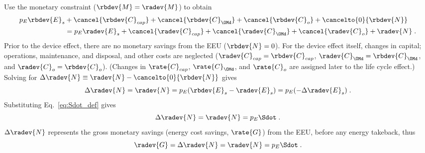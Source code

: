 \begin{landscape}
{Use the monetary constraint ($\rbdev{M} = \radev{M}$) to obtain
%
\begin{align}
  p_E \rbdev{E}_s &+ \cancel{\rbdev{C}_{cap}} + \cancel{\rbdev{C}_{\OMd}} + \cancel{\rbdev{C}_o} + \cancelto{0}{\rbdev{N}} \nonumber \\
                  &= p_E \radev{E}_s + \cancel{\radev{C}_{cap}} + \cancel{\radev{C}_{\OMd}} + \cancel{\radev{C}_o}  + \radev{N} \; .
\end{align}
%
Prior to the device effect, there are no monetary savings from the EEU ($\rbdev{N} = 0$).
For the device effect itself, 
changes in capital; operations, maintenance, and disposal, and other costs are neglected
($\radev{C}_{cap} = \rbdev{C}_{cap}$, $\radev{C}_{\OMd} = \rbdev{C}_{\OMd}$, and $\radev{C}_o = \rbdev{C}_o$).
(Changes in $\rate{C}_{cap}$, $\rate{C}_{\OMd}$, and $\rate{C}_o$ 
are assigned later to the life cycle effect.)
Solving for $\Delta \radev{N} \equiv \radev{N} - \cancelto{0}{\rbdev{N}}$ gives 
%
\begin{equation}
  \Delta \radev{N} = \radev{N} = p_E(\rbdev{E}_s - \radev{E}_s) = p_E (-\Delta \radev{E}_s) \; .
\end{equation}
%
Substituting Eq.~\ref{eq:Sdot_def} gives
%
\begin{equation}
  \Delta \radev{N} = \radev{N} = p_E \Sdot \; .
\end{equation}
%
$\Delta \radev{N}$ represents the gross monetary savings (energy cost savings, $\rate{G}$) from the EEU, 
before any energy takeback, thus
%
\begin{equation} \label{eq:G_dot}
  \radev{G} = \Delta \radev{N} = \radev{N} = p_E \Sdot \; .
\end{equation}
}

\end{landscape}
